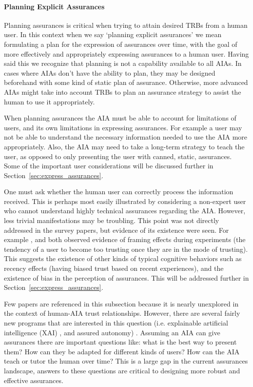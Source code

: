     \paragraph{Planning Explicit Assurances} Planning assurances is critical when trying to attain desired TRBs from a human user. In this context when we say `planning explicit assurances' we mean formulating a plan for the expression of assurances over time, with the goal of more effectively and appropriately expressing assurances to a human user. Having said this we recognize that planning is not a capability available to all AIAs. In cases where AIAs don't have the ability to plan, they may be designed beforehand with some kind of static plan of assurance. Otherwise, more advanced AIAs might take into account TRBs to plan an assurance strategy to assist the human to use it appropriately.

    When planning assurances the AIA must be able to account for limitations of users, and its own limitations in expressing assurances. For example a user may not be able to understand the necessary information needed to use the AIA more appropriately. Also, the AIA may need to take a long-term strategy to teach the user, as opposed to only presenting the user with canned, static, assurances. Some of the important user considerations will be discussed further in Section~\ref{sec:express_assurances}.
    
    One must ask whether the human user can correctly process the information received. This is perhaps most easily illustrated by considering a non-expert user who cannot understand highly technical assurances regarding the AIA. However, less trivial manifestations may be troubling. This point was not directly addressed in the survey papers, but evidence of its existence were seen. For example \cite{Riley1996-qm}, and \cite{Freedy2007-sg} both observed evidence of framing effects during experiments (the tendency of a user to become too trusting once they are in the mode of trusting). This suggests the existence of other kinds of typical cognitive behaviors such as recency effects (having biased trust based on recent experiences), and the existence of bias in the perception of assurances. This will be addressed further in Section~\ref{sec:express_assurances}.

    Few papers are referenced in this subsection because it is nearly unexplored in the context of human-AIA trust relationships. However, there are several fairly new programs that are interested in this question (i.e. explainable artificial intelligence (XAI) \cite{Gunning2017-ih}, and assured autonomy) . Assuming an AIA can give assurances there are important questions like: what is the best way to present them? How can they be adapted for different kinds of users? How can the AIA teach or tutor the human over time? This is a large gap in the current assurances landscape, answers to these questions are critical to designing more robust and effective assurances.

